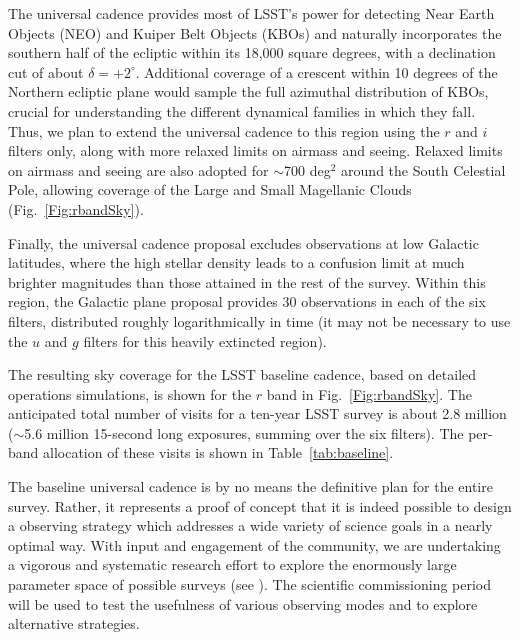 The universal cadence provides most of LSST's power for detecting Near Earth
Objects (NEO) and Kuiper Belt Objects (KBOs) and naturally
incorporates the southern half of the ecliptic
within its 18,000 square degrees, with a declination cut of about
$\delta = +2^\circ$.  Additional coverage of a crescent within 10
degrees of the Northern
ecliptic plane would sample the full azimuthal distribution of KBOs,
crucial for understanding the different dynamical families in which
they fall.
Thus, we plan to extend
 the universal cadence to this region using the
$r$ and $i$ filters only, along
with more relaxed limits on airmass and seeing. Relaxed limits on airmass and
seeing are also adopted for $\sim$700 deg$^2$ around the South Celestial
Pole, allowing coverage of the Large and Small Magellanic Clouds
(Fig.~\ref{Fig:rbandSky}).

Finally, the universal cadence proposal excludes observations at low
Galactic latitudes, where the high stellar
density leads to a confusion limit at much brighter magnitudes than those
attained in the rest of the survey. Within this region, the Galactic plane
proposal provides 30 observations in each of the six filters, distributed
roughly logarithmically in time (it may not be necessary to use the
$u$ and $g$ filters for this heavily extincted region).

The resulting sky coverage for the LSST baseline
cadence, based on detailed operations simulations, is shown for the
$r$ band in Fig.~\ref{Fig:rbandSky}. The anticipated total number of visits
for a ten-year LSST survey is about 2.8 million ($\sim$5.6 million 15-second long
exposures, summing over the six filters). The per-band allocation of
these visits is shown in Table~\ref{tab:baseline}.

The baseline universal cadence is by no means the definitive plan for the entire
survey. Rather, it represents a proof of concept that it is indeed possible to
design a observing strategy which addresses a wide variety of science goals in a nearly
optimal way. With input and engagement of the community, we are
undertaking a vigorous and systematic research effort to explore
the enormously large parameter space of possible surveys (see \citet{2017arXiv170804058L}). The
scientific commissioning period
will be used to test the usefulness of various observing modes and to explore
alternative strategies.


